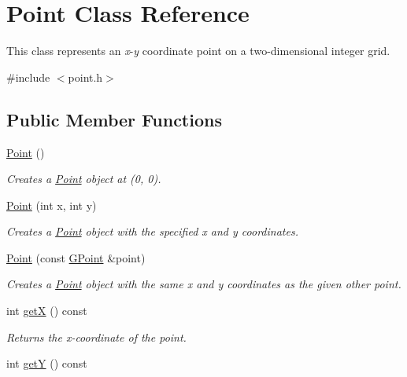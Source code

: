 \hypertarget{classPoint}{}\section{Point Class Reference}
\label{classPoint}


This class represents an {\itshape x}-\/{\itshape y} coordinate point on a two-\/dimensional integer grid.  




{\ttfamily \#include $<$point.\+h$>$}

\subsection*{Public Member Functions}
\begin{DoxyCompactItemize}
\item 
\mbox{\hyperlink{classPoint_ae08c5f0c5b4c75a3e0f33dada5f2fcba}{Point}} ()
\begin{DoxyCompactList}\small\item\em Creates a {\ttfamily \mbox{\hyperlink{classPoint}{Point}}} object at (0, 0). \end{DoxyCompactList}\item 
\mbox{\hyperlink{classPoint_a6773b78ca9523d4d482ac886b41a1bfc}{Point}} (int x, int y)
\begin{DoxyCompactList}\small\item\em Creates a {\ttfamily \mbox{\hyperlink{classPoint}{Point}}} object with the specified x and y coordinates. \end{DoxyCompactList}\item 
\mbox{\hyperlink{classPoint_af5c561032606b32861e8ebdc949397ad}{Point}} (const \mbox{\hyperlink{classGPoint}{G\+Point}} \&point)
\begin{DoxyCompactList}\small\item\em Creates a {\ttfamily \mbox{\hyperlink{classPoint}{Point}}} object with the same x and y coordinates as the given other point. \end{DoxyCompactList}\item 
int \mbox{\hyperlink{classPoint_ae6902baa2934561358fc7f8f3852d4f6}{getX}} () const
\begin{DoxyCompactList}\small\item\em Returns the {\itshape x}-\/coordinate of the point. \end{DoxyCompactList}\item 
int \mbox{\hyperlink{classPoint_afaf0a0403410a186997c1477e8bf6897}{getY}} () const

\end{DoxyCompactItemize}
